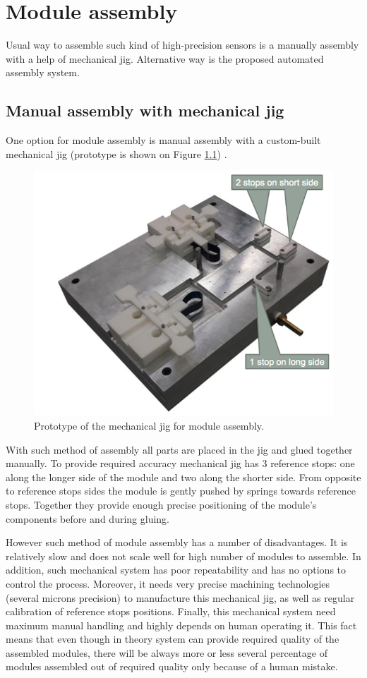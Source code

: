 \chapter{Module assembly}

Usual way to assemble such kind of high-precision sensors is a manually assembly with a help of mechanical jig. Alternative way is the proposed automated assembly system.

\section{Manual assembly with mechanical jig}

One option for module assembly is manual assembly with a custom-built mechanical jig (prototype is shown on Figure \ref{fig:mechanical_jig}) \cite{Automated_assembly_slides}.

\begin{figure}[ht]\centering
\includegraphics[width=0.7\linewidth]{Data/Module_assembly/Mechanical_jig.png}
\caption{Prototype of the mechanical jig for module assembly.}
\label{fig:mechanical_jig}
\end{figure}

With such method of assembly all parts are placed in the jig and glued together manually. To provide required accuracy mechanical jig has 3 reference stops: one along the longer side of the module and two along the shorter side. From opposite to reference stops sides the module is gently pushed by springs towards reference stops. Together they provide enough precise positioning of the module's components before and during gluing.

However such method of module assembly has a number of disadvantages. It is relatively slow and does not scale well for high number of modules to assemble. In addition, such mechanical system has poor repeatability and has no options to control the process. Moreover, it needs very precise machining technologies (several microns precision) to manufacture this mechanical jig, as well as regular calibration of reference stops positions. Finally, this mechanical system need maximum manual handling and highly depends on human operating it. This fact means that even though in theory system can provide required quality of the assembled modules, there will be always more or less several percentage of modules assembled out of required quality only because of a human mistake.

